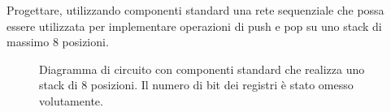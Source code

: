 \begin{exrc}
	Progettare, utilizzando componenti standard una rete sequenziale che possa essere utilizzata per implementare operazioni di push e pop su uno stack di massimo 8 posizioni.
	
	\begin{figure}[H]
		\centering
		\scalebox{0.5}{}
		\caption{Diagramma di circuito con componenti standard che realizza uno stack di 8 posizioni. Il numero di bit dei registri è stato omesso volutamente.}
		\label{fig:homeworkstack}
	\end{figure}
\end{exrc}